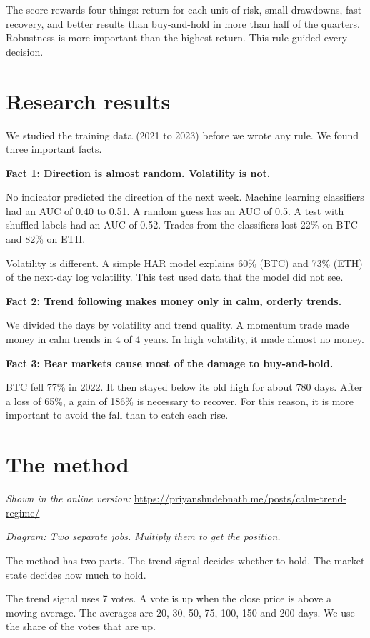 \documentclass[11pt,a4paper]{article}
\begin{document}
The score rewards four things: return for each unit of risk, small drawdowns, fast recovery, and better results than buy-and-hold in more than half of the quarters. Robustness is more important than the highest return. This rule guided every decision.

\section{Research results}

We studied the training data (2021 to 2023) before we wrote any rule. We found three important facts.

\textbf{Fact 1: Direction is almost random. Volatility is not.}

No indicator predicted the direction of the next week. Machine learning classifiers had an AUC of 0.40 to 0.51. A random guess has an AUC of 0.5. A test with shuffled labels had an AUC of 0.52. Trades from the classifiers lost 22\% on BTC and 82\% on ETH.

Volatility is different. A simple HAR model explains 60\% (BTC) and 73\% (ETH) of the next-day log volatility. This test used data that the model did not see.

\textbf{Fact 2: Trend following makes money only in calm, orderly trends.}

We divided the days by volatility and trend quality. A momentum trade made money in calm trends in 4 of 4 years. In high volatility, it made almost no money.

\textbf{Fact 3: Bear markets cause most of the damage to buy-and-hold.}

BTC fell 77\% in 2022. It then stayed below its old high for about 780 days. After a loss of 65\%, a gain of 186\% is necessary to recover. For this reason, it is more important to avoid the fall than to catch each rise.

\section{The method}

\noindent\textit{Shown in the online version:} \url{https://priyanshudebnath.me/posts/calm-trend-regime/}\par\textit{Diagram: Two separate jobs. Multiply them to get the position.}

The method has two parts. The trend signal decides whether to hold. The market state decides how much to hold.

The trend signal uses 7 votes. A vote is up when the close price is above a moving average. The averages are 20, 30, 50, 75, 100, 150 and 200 days. We use the share of the votes that are up.
\end{document}
